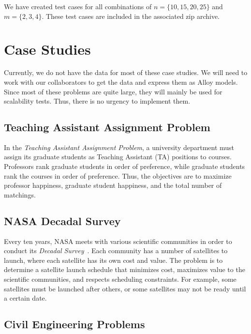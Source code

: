 \documentclass[11pt]{article}
\begin{document}
We have created test cases for all combinations of $n = \{10, 15, 20,
25\}$ and $m = \{2, 3, 4\}$. These test cases are included in the
associated zip archive.

\section{Case Studies}\label{sec:case_studies}

Currently, we do not have the data for most of these case studies. We
will need to work with our collaborators to get the data and express
them as Alloy models. Since most of these problems are quite large,
they will mainly be used for scalability tests. Thus, there is no
urgency to implement them.

\subsection{Teaching Assistant Assignment Problem}\label{sec:ta_problem}

In the \textit{Teaching Assistant Assignment Problem}, a university
department must assign its graduate students as Teaching Assistant (TA)
positions to courses. Professors rank graduate students in order of
preference, while graduate students rank the courses in order of
preference. Thus, the objectives are to maximize professor happiness,
graduate student happiness, and the total number of matchings.

\subsection{NASA Decadal Survey}\label{sec:decadal_survey}

Every ten years, NASA meets with various scientific communities in
order to conduct its \textit{Decadal Survey}~\cite{ref:nasa11}. Each
community has a number of satellites to launch, where each satellite
has its own cost and value. The problem is to determine a satellite
launch schedule that minimizes cost, maximizes value to the scientific
communities, and respects scheduling constraints. For example, some
satellites must be launched after others, or some satellites may not be
ready until a certain date.

\subsection{Civil Engineering Problems}\label{sec:civ_eng}
\end{document}

